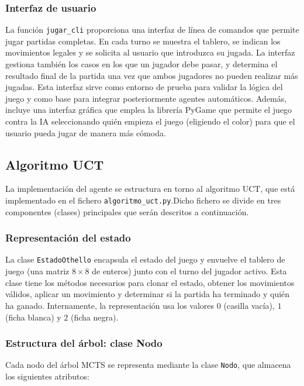 \documentclass[conference,a4paper]{IEEEtran}
\begin{document}
\subsubsection{\textbf{Interfaz de usuario}}

La función \texttt{jugar\_cli} proporciona una interfaz de línea de comandos que permite jugar partidas completas. En cada turno se muestra el tablero, se indican los movimientos legales y se solicita al usuario que introduzca su jugada. La interfaz gestiona también los casos en los que un jugador debe pasar, y determina el resultado final de la partida una vez que ambos jugadores no pueden realizar más jugadas. Esta interfaz sirve como entorno de prueba para validar la lógica del juego y como base para integrar posteriormente agentes automáticos.
Además, incluye una interfaz gráfica que emplea la librería PyGame que permite el juego contra la IA seleccionando quién empieza el juego (eligiendo el color) para que el usuario pueda jugar de manera más cómoda. 


\subsection{\textbf{Algoritmo UCT}}

La implementación del agente se estructura en torno al algoritmo UCT,
que está implementado en el fichero \texttt{algoritmo\_uct.py}.Dicho fichero se divide en tres componentes (clases) principales que serán descritos a continuación.

\subsubsection{\textbf{Representación del estado}}

La clase \texttt{EstadoOthello} encapsula el estado del juego y envuelve el tablero de juego (una matriz $8 \times 8$ de enteros) junto con el turno del jugador activo. Esta clase tiene los métodos necesarios para clonar el estado, obtener los movimientos válidos, aplicar un movimiento y determinar si la partida ha terminado y quién ha ganado. Internamente, la representación usa los valores $0$
(casilla vacía), $1$ (ficha blanca) y $2$ (ficha negra).

\subsubsection{\textbf{Estructura del árbol: clase Nodo}}

Cada nodo del árbol MCTS se representa mediante la clase \texttt{Nodo}, que
almacena los siguientes atributos:
\end{document}
